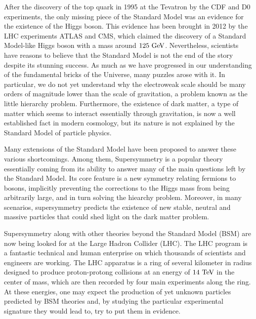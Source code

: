 After the discovery of the top quark in 1995 at the Tevatron by the CDF and D0 experiments,
the only missing piece of the Standard Model was an evidence for the existence of the Higgs
boson. This evidence has been brought in 2012 by the LHC experiments ATLAS and CMS,
which claimed the discovery of a Standard Model-like Higgs boson with a mass around
$125~\text{GeV}$. Nevertheless, scientists have reasons to believe that the Standard Model is not
the end of the story despite its stunning success. As much as we have progressed in our
understanding of the fundamental bricks of the Universe, many puzzles arose with it. In
particular, we do not yet understand why the electroweak scale should be many orders of
magnitude lower than the scale of gravitation, a problem known as the little hierarchy
problem. Furthermore, the existence of dark matter, a type of matter which seems to interact
essentially through gravitation, is now a well established fact in modern cosmology, but
its nature is not explained by the Standard Model of particle physics.

Many extensions of the Standard Model have been proposed to answer these various shortcomings.
Among them, Supersymmetry is a popular theory essentially coming from its ability to answer
many of the main questions left by the Standard Model. Its core feature is a new symmetry
relating fermions to bosons, implicitly preventing the corrections to the Higgs mass from
being arbitrarily large, and in turn solving the hiearchy problem. Moreover, in many scenarios,
supersymmetry predicts the existence of new stable, neutral and massive particles that
could shed light on the dark matter problem.

Supersymmetry along with other theories beyond the Standard Model (BSM) are now being looked for
at the Large Hadron Collider (LHC). The LHC program is a fantastic technical and human
enterprise on which thousands of scientists and engineers are working. The LHC apparatus
is a ring of several kilometer in radius designed to produce proton-protong collisions at
an energy of $14~\text{TeV}$ in the center of mass, which are then recorded by four main
experiments along the ring. At these energies, one may expect the production of yet unknown
particles predicted by BSM theories and, by studying the particular experimental signature
they would lead to, try to put them in evidence.

